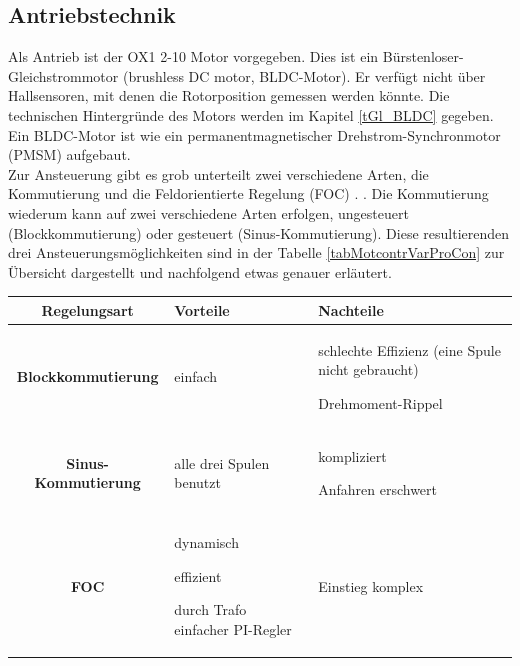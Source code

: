 \subsection*{Antriebstechnik}
Als Antrieb ist der OX1 2-10 Motor vorgegeben. Dies ist ein Bürstenloser-Gleichstrommotor (brushless DC motor, BLDC-Motor). Er verfügt nicht über Hallsensoren, mit denen die Rotorposition gemessen werden könnte. Die technischen Hintergründe des Motors werden im Kapitel \ref{tGl_BLDC} gegeben. Ein BLDC-Motor ist wie ein permanentmagnetischer Drehstrom-Synchronmotor (PMSM) aufgebaut.\\
Zur Ansteuerung gibt es grob unterteilt zwei verschiedene Arten, die Kommutierung und die Feldorientierte Regelung (FOC) \cite{BLDC}. . Die Kommutierung wiederum kann auf zwei verschiedene Arten erfolgen, ungesteuert (Blockkommutierung) oder gesteuert (Sinus-Kommutierung). Diese resultierenden drei Ansteuerungsmöglichkeiten sind in der Tabelle \ref{tabMotcontrVarProCon} zur Übersicht dargestellt und nachfolgend etwas genauer erläutert. 
\begin{center}
	\begin{tabularx}{\textwidth}{|c|X|X|}
		\hline 
		\textbf{Regelungsart} & \textbf{Vorteile} & \textbf{Nachteile} \\ 
		\hline 
		\textbf{Blockkommutierung} & einfach & schlechte Effizienz (eine Spule nicht gebraucht) 
		
		Drehmoment-Rippel \\
		\hline 
		\textbf{Sinus-Kommutierung} & alle drei Spulen benutzt & kompliziert
		
		Anfahren erschwert \\ 
		\hline 
		\textbf{FOC} & dynamisch 
		
		effizient 
		
		durch Trafo einfacher PI-Regler & Einstieg komplex \\ 
		\hline 
	\end{tabularx} 
	\label{tabMotcontrVarProCon}
\end{center}



